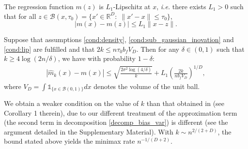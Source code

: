 \begin{assumption}\label{cond:lip}
The regression function $m(z)$ is $L_1$-Lipschitz at $x$, \textit{i.e.} there exists $L_1>0$ such that for all $z \in \mathcal{B}(x, \tau_0)=\{x'\in \mathbb{R}^D:\; \| x'-x\| \leq \tau_0  \}$,
\begin{equation*}
|m (x) - m (z) | \leq  L_1\|x-z\|  .
\end{equation*}
\end{assumption}

\begin{theorem}\label{theorem:loco}
Suppose that assumptions \ref{cond:density}, \ref{cond:sub_gaussian_inovation} and \ref{cond:lip} are fulfilled and that $2  k  \leq n \tau_0  b_fV_D $. Then for any $\delta \in (0,1)$ such that  $ k\geq 4   \log(2n/\delta)   $, we have with probability $1-\delta$:
\begin{align*}
|\hat m_k (x) - m  (x)|  \leq  \sqrt{ \frac{2  \sigma^2 \log(4/\delta)}{k} } + L_1 \left (\frac{ 2  k }{ n b_fV_D}  \right)^{1/ D},
\end{align*}
where $V_D= \int \mathds{1}_{\{x\in \mathcal{B}(0,1)\}}dx $ denotes the volume of the unit ball.
\end{theorem}

We obtain a weaker condition on the value of $k$ than that obtained in \cite{jiangNonAsymptoticUniformRates2019} (see  Corollary 1 therein), due to our different treatment of the approximation term (the second term in decomposition \eqref{decomp_bias_var}) is different (see the argument detailed in the Supplementary Material). With $k\sim n^{2/(2+D)}$, the bound stated above yields the minimax rate $n^{-1/(D+2)}$. 
